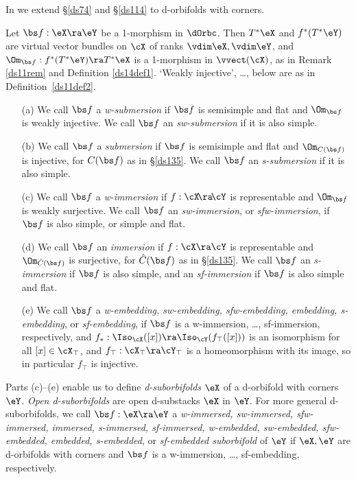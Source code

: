 \documentclass{article}
\begin{document}
In \cite[\S 12.4]{Joyc6} we extend \S\ref{ds74} and \S\ref{ds114} to
d-orbifolds with corners.

\begin{dfn} Let $\bs f:\eX\ra\eY$ be a 1-morphism in $\dOrbc$. Then
$T^*\eX$ and $f^*(T^*\eY)$ are virtual vector bundles on $\cX$ of
ranks $\vdim\eX,\vdim\eY$, and $\Om_{\bs f}:f^*(T^*\eY)\ra T^*\eX$
is a 1-morphism in $\vvect(\cX)$, as in Remark \ref{ds11rem} and
Definition \ref{ds14def1}. `Weakly injective', \ldots, below are as
in Definition~\ref{ds11def2}.
\begin{itemize}
\setlength{\itemsep}{0pt}
\setlength{\parsep}{0pt}
\item[(a)] We call $\bs f$ a {\it w-submersion\/} if $\bs f$ is
semisimple and flat and $\Om_{\bs f}$ is weakly injective. We
call $\bs f$ an {\it sw-submersion\/} if it is also simple.
\item[(b)] We call $\bs f$ a {\it submersion\/} if $\bs f$ is
semisimple and flat and $\Om_{C(\bs f)}$ is injective, for
$C(\bs f)$ as in \S\ref{ds135}. We call $\bs f$ an {\it
s-submersion\/} if it is also simple.
\item[(c)] We call $\bs f$ a {\it w-immersion\/} if
$f:\cX\!\ra\!\cY$ is representable and $\Om_{\bs f}$ is weakly
surjective. We call $\bs f$ an {\it sw-immersion}, or {\it
sfw-immersion}, if $\bs f$ is also simple, or simple and flat.
\item[(d)] We call $\bs f$ an {\it immersion\/} if
$f:\cX\ra\cY$ is representable and $\Om_{\smash{\hat C(\bs f)}}$
is surjective, for $\hat C(\bs f)$ as in \S\ref{ds135}. We call
$\bs f$ an {\it s-immersion\/} if $\bs f$ is also simple, and an
{\it sf-immersion\/} if $\bs f$ is also simple and flat.
\item[(e)] We call $\bs f$ a {\it w-embedding, sw-embedding,
sfw-embedding, embedding, s-embedding}, or {\it sf-embedding},
if $\bs f$ is a w-immersion, \ldots, sf-immersion, respectively,
and $f_*:\Iso_\cX([x])\ra\Iso_\cY(f_\top([x]))$ is an
isomorphism for all $[x]\in\cX_\top$, and $f_\top:\cX_\top
\ra\cY_\top$ is a homeomorphism with its image, so in particular
$f_\top$ is injective.
\end{itemize}

Parts (c)--(e) enable us to define {\it
d-suborbifolds\/} $\eX$ of
a d-orbifold with corners $\eY$. {\it Open d-suborbifolds\/} are
open d-substacks $\eX$ in $\eY$. For more general d-suborbifolds, we
call $\bs f:\eX\ra\eY$ a {\it w-immersed, sw-immersed, sfw-immersed,
immersed, s-immersed, sf-immersed, w-embedded, sw-embedded,
sfw-embedded, embedded, s-embedded}, or {\it sf-embedded
suborbifold\/} of $\eY$ if $\eX,\eY$ are d-orbifolds with corners
and $\bs f$ is a w-immersion, \ldots, sf-embedding, respectively.
\label{ds14def3}
\end{dfn}
\end{document}
